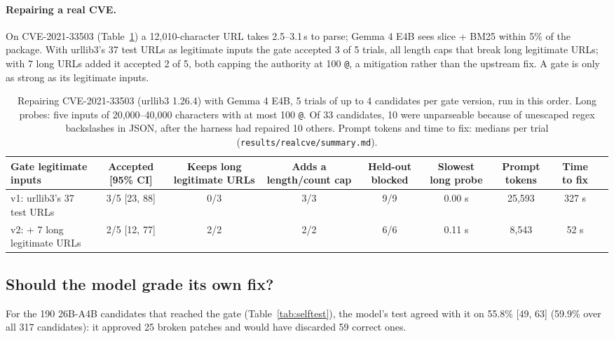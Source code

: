 \documentclass[10pt,a4paper]{article}
\newcommand{\code}[1]{\texttt{#1}}
\begin{document}
\paragraph{Repairing a real CVE.} On CVE-2021-33503 (Table~\ref{tab:cverep}) a 12,010-character URL takes 2.5--3.1\,s to parse; Gemma 4 E4B sees slice + BM25 within 5\% of the package. With urllib3's 37 test URLs as legitimate inputs the gate accepted 3 of 5 trials, all length caps that break long legitimate URLs; with 7 long URLs added it accepted 2 of 5, both capping the authority at 100 \code{@}, a mitigation rather than the upstream fix. A gate is only as strong as its legitimate inputs.

\begin{table}[H]
\centering\small
\caption{Repairing CVE-2021-33503 (urllib3 1.26.4) with Gemma 4 E4B, 5 trials of up to 4 candidates per gate version, run in this order. Long probes: five inputs of 20,000--40,000 characters with at most 100 \code{@}. Of 33 candidates, 10 were unparseable because of unescaped regex backslashes in JSON, after the harness had repaired 10 others. Prompt tokens and time to fix: medians per trial (\code{results/realcve/summary.md}).}
\label{tab:cverep}
\begin{adjustbox}{max width=\linewidth}\begin{tabular}{lcccccccc}
\toprule
Gate legitimate inputs & Accepted [95\% CI] & Keeps long legitimate URLs & Adds a length/count cap & Held-out blocked & Slowest long probe & Prompt tokens & Time to fix\\
\midrule
v1: urllib3's 37 test URLs & 3/5 [23, 88] & 0/3 & 3/3 & 9/9 & 0.00 s & 25,593 & 327 s\\
v2: + 7 long legitimate URLs & 2/5 [12, 77] & 2/2 & 2/2 & 6/6 & 0.11 s & 8,543 & 52 s\\
\bottomrule
\end{tabular}\end{adjustbox}
\end{table}



\subsection{Should the model grade its own fix?}
For the 190 26B-A4B candidates that reached the gate (Table~\ref{tab:selftest}), the model's test agreed with it on 55.8\% [49, 63] (59.9\% over all 317 candidates): it approved 25 broken patches and would have discarded 59 correct ones.
\end{document}
